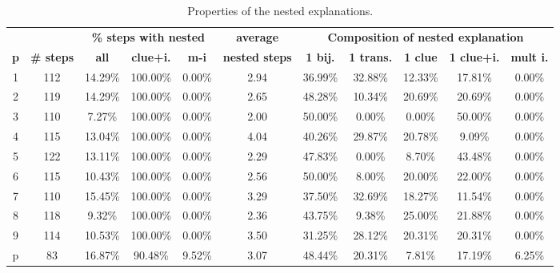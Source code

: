 \begin{table}[t]
	\centering
	\begin{tabular}{c|c|ccc|c|ccccc}
		           &                    &  \multicolumn{3}{c|}{\textbf{\% steps with nested}} & \multicolumn{1}{c|}{\textbf{average}} & \multicolumn{5}{c}{\textbf{Composition of nested explanation }}                                                                                       \\
		\textbf{p} & \textbf{\# steps } & \textbf{all}     & \textbf{clue+i.}                                & \textbf{m-i}          & \textbf{nested steps}                  & \textbf{1 bij.} & \textbf{1 trans.} & \textbf{1 clue} & \textbf{1 clue+i.} & \textbf{mult i.} \\\hline
		1 &      112 &  14.29\% &  100.00\% &  0.00\% &         2.94 &  36.99\% &   32.88\% &  12.33\% &    17.81\% &    0.00\% \\
		2 &      119 &  14.29\% &  100.00\% &  0.00\% &         2.65 &  48.28\% &   10.34\% &  20.69\% &    20.69\% &    0.00\% \\
		3 &      110 &   7.27\% &  100.00\% &  0.00\% &         2.00 &  50.00\% &    0.00\% &   0.00\% &    50.00\% &    0.00\% \\
		4 &      115 &  13.04\% &  100.00\% &  0.00\% &         4.04 &  40.26\% &   29.87\% &  20.78\% &     9.09\% &    0.00\% \\
		5 &      122 &  13.11\% &  100.00\% &  0.00\% &         2.29 &  47.83\% &    0.00\% &   8.70\% &    43.48\% &    0.00\% \\
		6 &      115 &  10.43\% &  100.00\% &  0.00\% &         2.56 &  50.00\% &    8.00\% &  20.00\% &    22.00\% &    0.00\% \\
		7 &      110 &  15.45\% &  100.00\% &  0.00\% &         3.29 &  37.50\% &   32.69\% &  18.27\% &    11.54\% &    0.00\% \\
		8 &      118 &   9.32\% &  100.00\% &  0.00\% &         2.36 &  43.75\% &    9.38\% &  25.00\% &    21.88\% &    0.00\% \\
		9 &      114 &  10.53\% &  100.00\% &  0.00\% &         3.50 &  31.25\% &   28.12\% &  20.31\% &    20.31\% &    0.00\% \\
		p &       83 &  16.87\% &   90.48\% &  9.52\% &         3.07 &  48.44\% &   20.31\% &   7.81\% &    17.19\% &    6.25\% \\
	\end{tabular}
	\caption{Properties of the nested explanations.}

	\label{table:nested_explanation}

\end{table}

